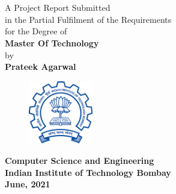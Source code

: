 \titlepage
\begin{center}
\noindent {\bf{\Large{ }}}\\
 {\bf{\Large{}}}\\
\end{center}
\vspace{25mm}
\begin{center}
A Project Report Submitted\\
in the Partial Fulfilment of the Requirements
\\
for the Degree of
\\
\vspace{30mm}
{\bf {\large Master Of Technology}}
\\
by
\\
{\bf{\Large Prateek Agarwal}}\\
\end{center}
\vspace{20mm}
\begin{figure}[h]
\centering
\includegraphics[width=0.25\textwidth]{./fig/iitblogo.png}

\end{figure}
\begin{center}
\vspace{3mm}
{\bf {\large {Computer Science and Engineering}}}\\
\vspace{2mm}
{\bf {\large {Indian Institute of Technology Bombay}}}\\
\vspace{3mm}
{\textbf{ June, 2021}}\\
\end{center}

